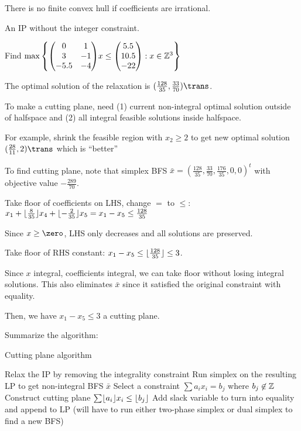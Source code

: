 There is no finite convex hull if coefficients are irrational.

\begin{defn}[LP relaxation]
  An IP without the integer constraint.
\end{defn}

\begin{example}
  Find $\max\qty{\mqty(0&1\\3&-1\\-5.5&-4)x \leq \mqty(5.5\\10.5\\-22) : x \in \Z^3}$
\end{example}
\begin{sol}

  The optimal solution of the relaxation is
  $(\frac{128}{35},\frac{33}{70})\trans$.

  To make a cutting plane, need (1) current non-integral optimal
  solution outside of halfspace and (2) all integral feasible
  solutions inside halfspace.

  For example, shrink the feasible region with $x_2 \geq 2$ to get
  new optimal solution $(\frac{28}{11},2)\trans$ which is ``better''

  To find cutting plane, note that simplex BFS
  $\bar x = (\frac{128}{35}, \frac{33}{70}, \frac{176}{35},0,0)^t$
  with objective value $-\frac{289}{70}$.

  Take floor of coefficients on LHS, change $=$ to $\leq$:
  $x_1 + \lfloor\frac{8}{35}\rfloor x_4 + \lfloor-\frac{2}{35}\rfloor x_5 = x_1 - x_5 \leq \frac{128}{35}$

  Since $x \geq \zero$, LHS only decreases and all solutions are preserved.

  Take floor of RHS constant: $x_1 - x_5 \leq \lfloor\frac{128}{35}\rfloor \leq 3$.

  Since $x$ integral, coefficients integral, we can take floor
  without losing integral solutions.
  This also eliminates $\bar x$ since it satisfied the original
  constraint with equality.

  Then, we have $x_1 - x_5 \leq 3$ a cutting plane.
\end{sol}


Summarize the algorithm:

\begin{algorithm}
  \caption{Cutting plane algorithm}
  \begin{algorithmic}[1]
    \State Relax the IP by removing the integrality constraint
    \State Run simplex on the resulting LP to get non-integral BFS $\bar x$
    \State Select a constraint $\sum a_i x_i = b_j$ where $b_j \not\in \mathbb{Z}$
    \State Construct cutting plane $\sum \lfloor a_i\rfloor x_i \leq \lfloor b_j\rfloor$
    \State Add slack variable to turn into equality and append to LP
    (will have to run either two-phase simplex or dual simplex to find a new BFS)
  \end{algorithmic}
\end{algorithm}
